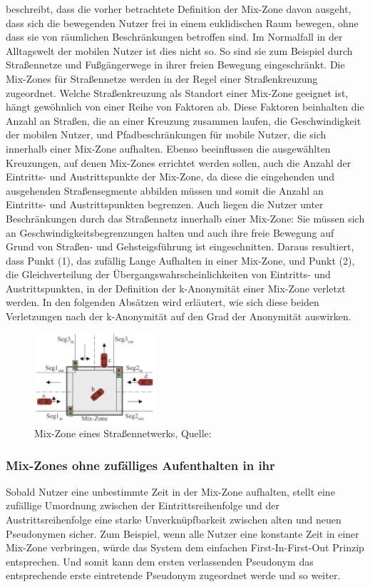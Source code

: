\cite{Palanisamy2011} beschreibt, dass die vorher betrachtete Definition der Mix-Zone davon ausgeht, dass sich die bewegenden Nutzer frei in einem euklidischen Raum bewegen, ohne dass sie von räumlichen Beschränkungen betroffen sind. Im Normalfall in der Alltagswelt der mobilen Nutzer ist dies nicht so. So sind sie zum Beispiel durch Straßennetze und Fußgängerwege in ihrer freien Bewegung eingeschränkt. Die Mix-Zones für Straßennetze werden in der Regel einer Straßenkreuzung zugeordnet. Welche Straßenkreuzung als Standort einer Mix-Zone geeignet ist, hängt gewöhnlich von einer Reihe von Faktoren ab. Diese Faktoren beinhalten die Anzahl an Straßen, die an einer Kreuzung zusammen laufen, die Geschwindigkeit der mobilen Nutzer, und Pfadbeschränkungen für mobile Nutzer, die sich innerhalb einer Mix-Zone aufhalten. Ebenso beeinflussen die ausgewählten Kreuzungen, auf denen Mix-Zones errichtet werden sollen, auch die Anzahl der Eintritts- und Austrittspunkte der Mix-Zone, da diese die eingehenden und ausgehenden Straßensegmente abbilden müssen und somit die Anzahl an Eintritts- und Austrittspunkten begrenzen. Auch liegen die Nutzer unter Beschränkungen durch das Straßennetz innerhalb einer Mix-Zone: Sie müssen sich an Geschwindigkeitsbegrenzungen halten und auch ihre freie Bewegung auf Grund von Straßen- und Gehsteigsführung ist eingeschnitten. Daraus resultiert, dass Punkt (1), das zufällig Lange Aufhalten in einer Mix-Zone, und Punkt (2), die Gleichverteilung der Übergangswahrscheinlichkeiten von Eintritts- und Austrittspunkten, in der Definition der k-Anonymität einer Mix-Zone verletzt werden. In den folgenden Absätzen wird erläutert, wie sich diese beiden Verletzungen nach \cite{Chow2011} der k-Anonymität auf den Grad der Anonymität auswirken.

\begin{figure}[!h]
	\centering
	\includegraphics[width=0.4\textwidth]{Bilder/MixZoneNetwork.PNG}
	\caption{Mix-Zone eines Straßennetwerks, Quelle: \protect\cite{Chow2011}}
	\label{fig_MixSrasse}
\end{figure}

\subsubsection{Mix-Zones ohne zufälliges Aufenthalten in ihr} Sobald Nutzer eine unbestimmte Zeit in der Mix-Zone aufhalten, stellt eine zufällige Umordnung zwischen der Eintrittsreihenfolge und der Austrittsreihenfolge eine starke Unverknüpfbarkeit zwischen alten und neuen Pseudonymen sicher. Zum Beispiel, wenn alle Nutzer eine konstante Zeit in einer Mix-Zone verbringen, würde das System dem einfachen First-In-First-Out Prinzip entsprechen. Und somit kann dem ersten verlassenden Pseudonym das entsprechende erste eintretende Pseudonym zugeordnet werde und so weiter.

